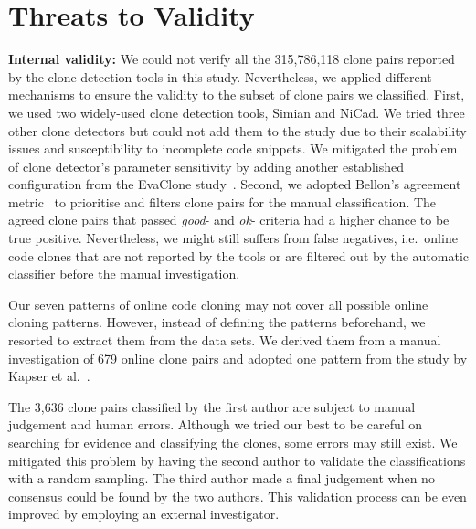 \documentclass[10pt,journal,compsoc]{IEEEtran}
\begin{document}
\section{Threats to Validity}

\textbf{Internal validity:} 
%
We could not verify all the 315,786,118 clone pairs reported by the
clone detection tools in this study.  Nevertheless, we applied
different mechanisms to ensure the validity to the subset of clone
pairs we classified.  First, we used two widely-used
clone detection tools, Simian and NiCad.  We tried three other
clone detectors but could not add them to the study due to their
scalability issues and susceptibility to incomplete code snippets.
We mitigated the problem of clone
detector's parameter sensitivity by adding another established
configuration from the EvaClone study~\cite{Wang2013}. 
Second, we adopted Bellon's agreement metric~\cite{Bellon2007}
to prioritise and filters clone pairs for the manual
classification. The agreed clone pairs that passed \textit{good}- and
\textit{ok}- criteria had a higher chance to be true positive. 
Nevertheless, we might still suffers from false negatives, i.e.~online 
code clones that are not reported by the tools or are filtered 
out by the automatic classifier before the manual investigation.



Our seven patterns of online code cloning may not cover all possible
online cloning patterns. However, instead of defining the patterns
beforehand, we resorted to extract them from the data sets. We derived
them from a manual investigation of 679 online clone pairs and adopted
one pattern from the study by Kapser et al.~\cite{Kapser2003}.

The 3,636 clone pairs classified by the first author are
subject to manual judgement and human errors.  Although we tried
our best to be careful on searching for evidence and classifying the
clones, some errors may still exist. We mitigated this problem by
having the second author to validate the classifications with a random
sampling. 
The third author made a final judgement when no consensus
could be found by the two authors. This validation process
can be even improved by employing an external investigator. 
\end{document}
